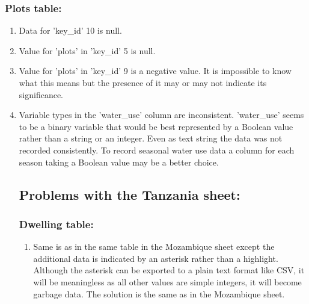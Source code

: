 \documentclass{article}
\begin{document}
\subsubsection{Plots table:}
\begin{enumerate}
    \item Data for 'key\_id' 10 is null.
    \item Value for 'plots' in 'key\_id' 5 is null.
    \item Value for 'plots' in 'key\_id' 9 is a negative value. It is impossible to know what this means but the presence of it may or may not indicate its significance.
    \item Variable types in the 'water\_use' column are inconsistent. 'water\_use' seems to be a binary variable that would be best represented by a Boolean value rather than a string or an integer. Even as text string the data was not recorded consistently. To record seasonal water use data a column for each season taking a Boolean value may be a better choice.
    \subsection{Problems with the Tanzania sheet:}
    \subsubsection{Dwelling table:}
    \begin{enumerate}
        \item Same is as in the same table in the Mozambique sheet except the additional data is indicated by an asterisk rather than a highlight. Although the asterisk can be exported to a plain text format like CSV, it will be meaningless as all other values are simple integers, it will become garbage data. The solution is the same as in the Mozambique sheet.
    \end{enumerate}

\end{enumerate}
\end{document}
